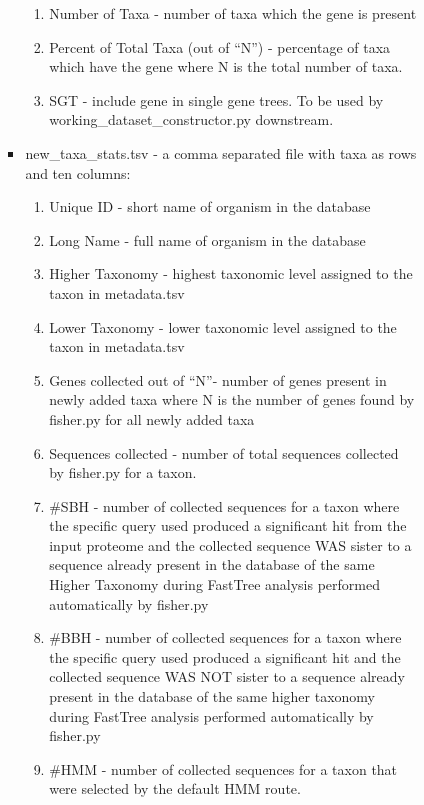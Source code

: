 \documentclass{article}
\begin{document}
\begin{enumerate}[itemsep=12pt]
\begin{description}
\begin{itemize}
\begin{itemize}
\begin{enumerate}[label=\arabic*.]
                        \item Number of Taxa - number of taxa which the gene is present 
                        \item Percent of Total Taxa (out of “N”) - percentage of taxa which have the gene where N is the total number of taxa.
                        \item SGT - include gene in single gene trees. To be used by working\_dataset\_constructor.py downstream.
                    \end{enumerate}
                    \item new\_taxa\_stats.tsv - a comma separated file with taxa as rows and ten columns:
                    \begin{enumerate}[label=\arabic*.]
                        \item Unique ID - short name of organism in the database
                        \item Long Name - full name of organism in the database
                        \item Higher Taxonomy - highest taxonomic level assigned to the taxon in metadata.tsv
                        \item Lower Taxonomy - lower taxonomic level assigned to the taxon in metadata.tsv
                        \item Genes collected out of “N”- number of genes present in newly added taxa where N is the number of genes found by fisher.py for all newly added taxa
                        \item Sequences collected - number of total sequences collected by fisher.py for a taxon.
                        \item \#SBH - number of collected sequences for a taxon where the specific query used produced a significant hit from the input proteome and the collected sequence WAS sister to a sequence already present in the database of the same Higher Taxonomy during FastTree analysis performed automatically by fisher.py
                        \item \#BBH - number of collected sequences for a taxon where the specific query used produced a significant hit and the collected sequence WAS NOT sister to a sequence already present in the  database of the same higher taxonomy during FastTree analysis performed automatically by fisher.py
                        \item \#HMM - number of collected sequences for a taxon that were  selected by the default HMM route.

\end{enumerate}
\end{itemize}
\end{itemize}
\end{description}
\end{enumerate}
\end{document}
